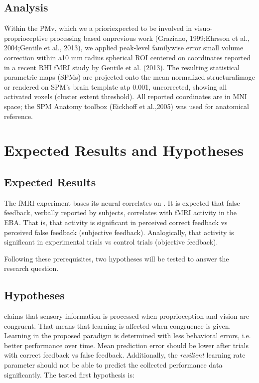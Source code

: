 \documentclass[man]{apa7}
\begin{document}
\subsection{Analysis}

\"Within the PMv, which we a prioriexpected to be involved in visuo-proprioceptive processing based onprevious work (Graziano, 1999;Ehrsson et al., 2004;Gentile et al., 2013), we applied peak-level familywise error small volume correction within a10 mm radius spherical ROI centered on coordinates reported in a recent RHI fMRI study by Gentile et al. (2013). The resulting statistical parametric maps (SPMs) are projected onto the mean normalized structuralimage or rendered on SPM’s brain template atp 0.001, uncorrected, showing all activated voxels (cluster extent threshold). All reported coordinates are in MNI space; the SPM Anatomy toolbox (Eickhoff et al.,2005) was used for anatomical reference.\"

\parencite{Limanowski2016}

\section{Expected Results and Hypotheses}

\subsection{Expected Results}

The fMRI experiment bases its neural correlates on \parencite{Limanowski2016}. It is expected that false feedback, verbally reported by subjects, correlates with fMRI activity in the EBA. That is, that activity is significant in perceived correct feedback vs perceived false feedback (subjective feedback). Analogically, that activity is significant in experimental trials vs control trials (objective feedback).

Following these prerequisites, two hypotheses will be tested to answer the research question.

\subsection{Hypotheses}
\citeauthor{Limanowski2016} claims that sensory information is processed when proprioception and vision are congruent. That means that learning is affected when congruence is given. Learning in the proposed paradigm is determined with less behavioral errors, i.e. better performance over time. Mean prediction error should be lower after trials with correct feedback vs false feedback. Additionally, the \textit{resilient} learning rate parameter should not be able to predict the collected performance data significantly. The tested first hypothesis is:\\
\end{document}
